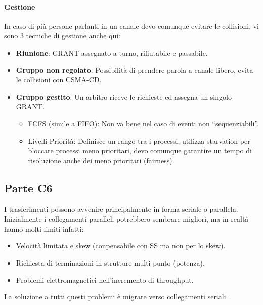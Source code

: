 \documentclass[12pt]{article}
\begin{document}
\paragraph{Gestione} In caso di più persone parlanti in un canale devo comunque evitare le collisioni, vi sono 3 tecniche di gestione anche qui:
\begin{itemize}
  \item \textbf{Riunione}: GRANT assegnato a turno, rifiutabile e passabile.
  \item \textbf{Gruppo non regolato}: Possibilità di prendere parola a canale libero, evita le collisioni con CSMA-CD.
  \item \textbf{Gruppo gestito}: Un arbitro riceve le richieste ed assegna un singolo GRANT.
  \begin{itemize}
    \item FCFS (simile a FIFO): Non va bene nel caso di eventi non ``sequenziabili''.
    \item Livelli Priorità: Definisce un rango tra i processi, utilizza starvation per bloccare processi meno prioritari, devo comunque garantire un tempo di risoluzione anche dei meno prioritari (fairness).
  \end{itemize}
\end{itemize}

\subsection{Parte C6}\label{c6}
I trasferimenti possono avvenire principalmente in forma seriale o parallela.\\
Inizialmente i collegamenti paralleli potrebbero sembrare migliori, ma in realtà hanno molti limiti infatti:
\begin{itemize}
  \item Velocità limitata e skew (conpensabile con SS ma non per lo skew).
  \item Richiesta di terminazioni in strutture multi-punto (potenza).
  \item Problemi elettromagnetici nell'incremento di throughput.
\end{itemize}
La soluzione a tutti questi problemi è migrare verso collegamenti seriali.
\end{document}
